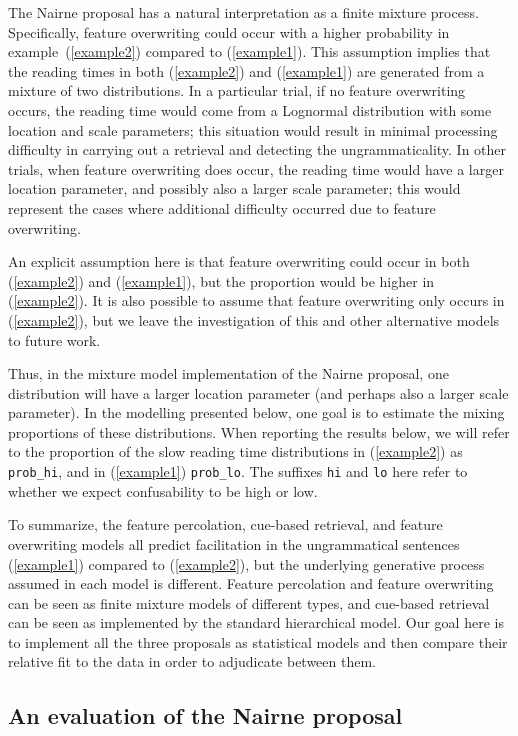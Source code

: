\documentclass{cambridge7A}\usepackage[]{graphicx}\usepackage[]{color}
\begin{document}
The Nairne proposal has a natural interpretation as a finite mixture process. Specifically, feature overwriting could occur with a higher probability in example~(\ref{example2}) compared to (\ref{example1}). This assumption implies that the reading times in both (\ref{example2}) and (\ref{example1}) are generated from a mixture of two distributions. 
In a particular trial, if no feature overwriting occurs, the reading time would come from a Lognormal distribution with some location and scale parameters; this situation would result in 
minimal processing difficulty in  carrying out a retrieval and detecting the ungrammaticality. In other trials,
when feature overwriting does occur, 
the reading time would have a larger location parameter, and possibly also a larger scale parameter; this would represent the cases where additional difficulty occurred due to feature overwriting. 

An explicit assumption here is that feature overwriting could occur in both (\ref{example2}) and (\ref{example1}), but the proportion would be higher in (\ref{example2}). It is also possible to assume that feature overwriting only occurs in 
(\ref{example2}), but we leave the investigation of this and other alternative models to future work. 

Thus, in the mixture model implementation of the Nairne proposal, one distribution will have a larger location parameter (and perhaps also a larger scale parameter).
In the modelling presented below, one goal is to estimate the mixing proportions of these distributions.
When reporting the results below, we will refer to the proportion of the slow reading time distributions in (\ref{example2}) as \texttt{prob\_hi}, and in (\ref{example1}) \texttt{prob\_lo}. The suffixes \texttt{hi} and \texttt{lo} here refer to whether we expect confusability to be high or low.

To summarize, the feature percolation, cue-based retrieval, and 
feature overwriting models all predict facilitation in the ungrammatical sentences (\ref{example1}) compared to (\ref{example2}), but the underlying generative process assumed in each model is different. Feature percolation and feature overwriting can be seen as finite mixture models of different types, and cue-based retrieval can be seen as implemented by the standard hierarchical model.
Our goal here is to implement all the three proposals as statistical models and then compare their relative fit to the data in order to adjudicate between them.


\subsection{An evaluation of the Nairne proposal}
\end{document}
